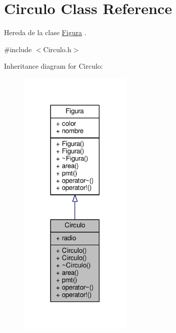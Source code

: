 \hypertarget{class_circulo}{\section{Circulo Class Reference}
\label{class_circulo}
}


Hereda de la clase \hyperlink{class_figura}{Figura} .  




{\ttfamily \#include $<$Circulo.\+h$>$}



Inheritance diagram for Circulo\+:
\nopagebreak
\begin{figure}[H]
\begin{center}
\leavevmode
\includegraphics[width=153pt]{class_circulo__inherit__graph}
\end{center}
\end{figure}
